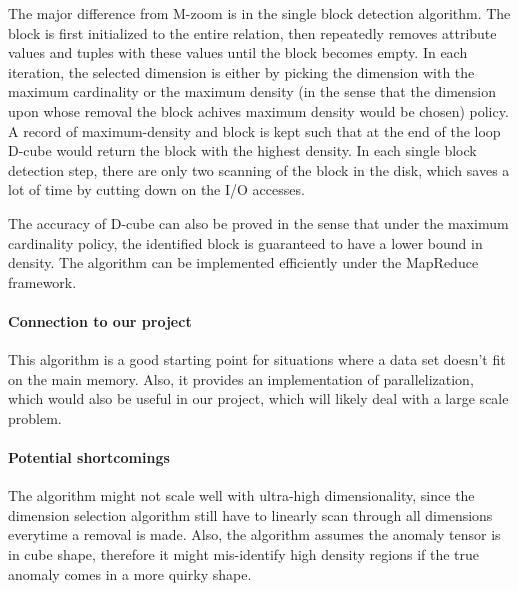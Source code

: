 The major difference from M-zoom is in the single block detection algorithm. The block is first initialized to the entire relation, then repeatedly removes attribute values and tuples with these values until the block becomes empty. In each iteration, the selected dimension is either by picking the dimension with the maximum cardinality or the maximum density (in the sense that the dimension upon whose removal the block achives maximum density would be chosen) policy. A record of maximum-density and block is kept such that at the end of the loop D-cube would return the block with the highest density. In each single block detection step, there are only two scanning of the block in the disk, which saves a lot of time by cutting down on the I/O accesses.

The accuracy of D-cube can also be proved in the sense that under the maximum cardinality policy, the identified block is guaranteed to have a lower bound in density. The algorithm can be implemented efficiently under the MapReduce framework.


\paragraph{Connection to our project} This algorithm is a good starting point for situations where a data set doesn't fit on the main memory. Also, it provides an implementation of parallelization, which would also be useful in our project, which will likely deal with a large scale problem.

\paragraph{Potential shortcomings} The algorithm might not scale well with ultra-high dimensionality, since the dimension selection algorithm still have to linearly scan through all dimensions everytime a removal is made. Also, the algorithm assumes the anomaly tensor is in cube shape, therefore it might mis-identify high density regions if the true anomaly comes in a more quirky shape.


